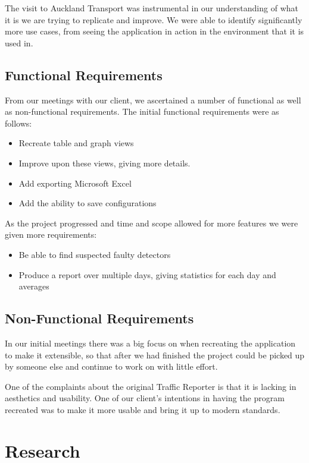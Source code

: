 \documentclass{article}
\begin{document}
The visit to Auckland Transport was instrumental in our
understanding of what it is we are trying to replicate and
improve. We were able to identify significantly more use
cases, from seeing the application in action in the environment
that it is used in.

\subsection{Functional Requirements}
From our meetings with our client, we ascertained a number of functional as well as non-functional requirements. The initial functional requirements were as follows:

\begin{itemize}
	\item Recreate table and graph views
	\item Improve upon these views, giving more details.
	\item Add exporting Microsoft Excel
	\item Add the ability to save configurations
\end{itemize}

As the project progressed and time and scope allowed for more features we were given more requirements:

\begin{itemize}
	\item Be able to find suspected faulty detectors
	\item Produce a report over multiple days, giving statistics for each day and averages
\end{itemize}

\subsection{Non-Functional Requirements}

In our initial meetings there was a big focus on when recreating the application to make it extensible, so that after we had finished the project could be picked up by someone else and continue to work on with little effort.

One of the complaints about the original Traffic Reporter is that it is lacking in aesthetics and usability. One of our client's intentions in having the program recreated was to make it more usable and bring it up to modern standards. 

\section{Research}
\end{document}
